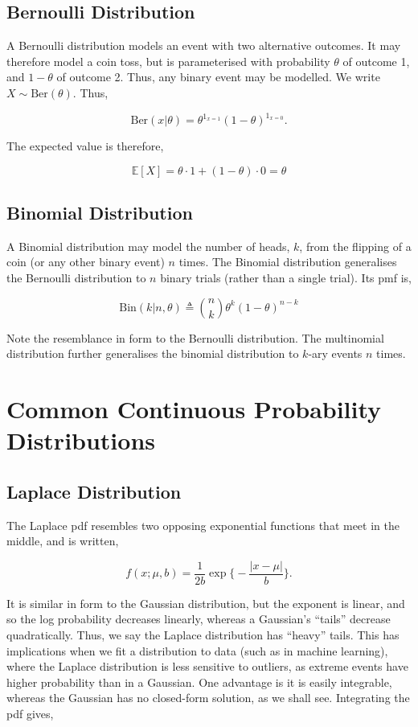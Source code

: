 \documentclass[11pt]{amsart}
\begin{document}
\subsection{Bernoulli Distribution}

A Bernoulli distribution models an event with two alternative outcomes. It may therefore model a coin toss, but is parameterised with probability $\theta$ of outcome 1, and $1 - \theta$ of outcome 2. Thus, any binary event may be modelled. We write $X \sim \text{Ber}(\theta)$. Thus,

$$\text{Ber}(x|\theta) = \theta^{1_{x=1}}(1 - \theta)^{1_{x=0}}.$$

The expected value is therefore,

$$\mathbb{E}[X] = \theta \cdot 1 + (1 - \theta) \cdot 0 = \theta$$

\subsection{Binomial Distribution}

A Binomial distribution may model the number of heads, $k$, from the flipping of a coin (or any other binary event) $n$ times. The Binomial distribution generalises the Bernoulli distribution to $n$ binary trials (rather than a single trial). Its pmf is,

$$\text{Bin}(k | n,\theta) \triangleq {{n}\choose{k}}\theta^{k}(1 - \theta)^{n-k}$$

Note the resemblance in form to the Bernoulli distribution. The multinomial distribution further generalises the binomial distribution to $k$-ary events $n$ times.

\section{Common Continuous Probability Distributions}

\subsection{Laplace Distribution}

The Laplace pdf resembles two opposing exponential functions that meet in the middle, and is written,

$$f(x ; \mu, b) = \frac{1}{2b}\exp\Bigg\{-\frac{|x - \mu|}{b}\Bigg\}.$$

It is similar in form to the Gaussian distribution, but the exponent is linear, and so the log probability decreases linearly, whereas a Gaussian's ``tails'' decrease quadratically. Thus, we say the Laplace distribution has ``heavy'' tails. This has implications when we fit a distribution to data (such as in machine learning), where the Laplace distribution is less sensitive to outliers, as extreme events have higher probability than in a Gaussian. One advantage is it is easily integrable, whereas the Gaussian has no closed-form solution, as we shall see. Integrating the pdf gives,
\end{document}
